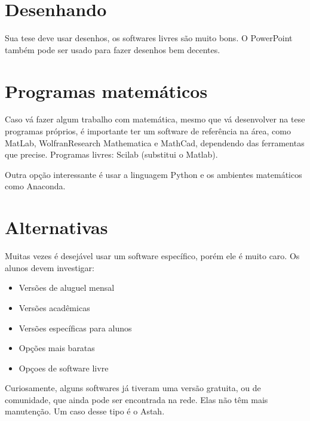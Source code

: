 \section{Desenhando}

Sua tese deve usar desenhos, os softwares livres são muito bons. O PowerPoint também pode ser usado para fazer desenhos bem decentes.

\section{Programas matemáticos}

Caso vá fazer algum trabalho com matemática, mesmo que vá desenvolver na tese programas próprios, é importante ter um software de referência na área, como MatLab, WolfranResearch Mathematica e MathCad, dependendo das ferramentas que precise.
Programas livres: Scilab (substitui o Matlab). 

Outra opção interessante é usar a linguagem Python e os ambientes matemáticos como Anaconda.

\section{Alternativas}

Muitas vezes é desejável usar um software específico, porém ele é muito caro. Os alunos devem investigar:

\begin{itemize}
    \item Versões de aluguel mensal
    \item Versões acadêmicas
    \item Versões específicas para alunos
    \item Opções mais baratas
    \item Opçoes de software livre
\end{itemize}

Curiosamente, alguns softwares já tiveram uma versão gratuita, ou de comunidade, que ainda pode ser encontrada na rede. Elas não têm mais manutenção. Um caso desse tipo é o Astah. 


